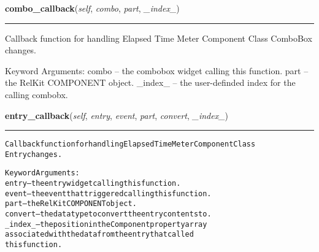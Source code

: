     \vspace{0.5ex}

\hspace{.8\funcindent}\begin{boxedminipage}{\funcwidth}

    \raggedright \textbf{combo\_callback}(\textit{self}, \textit{combo}, \textit{part}, \textit{\_index\_})

    \vspace{-1.5ex}

    \rule{\textwidth}{0.5\fboxrule}
\setlength{\parskip}{2ex}
    Callback function for handling Elapsed Time Meter Component Class 
    ComboBox changes.

    Keyword Arguments: combo   -- the combobox widget calling this 
    function. part    -- the RelKit COMPONENT object. \_index\_ -- the 
    user-definded index for the calling combobx.

\setlength{\parskip}{1ex}
    \end{boxedminipage}

    \label{reliafree:meters:meter:ElapsedTime:entry_callback}

    \vspace{0.5ex}

\hspace{.8\funcindent}\begin{boxedminipage}{\funcwidth}

    \raggedright \textbf{entry\_callback}(\textit{self}, \textit{entry}, \textit{event}, \textit{part}, \textit{convert}, \textit{\_index\_})

    \vspace{-1.5ex}

    \rule{\textwidth}{0.5\fboxrule}
\setlength{\parskip}{2ex}
\begin{alltt}
Callback function for handling Elapsed Time Meter Component Class
Entry changes.

Keyword Arguments:
entry   -- the entry widget calling this function.
event   -- the event that triggered calling this function.
part    -- the RelKit COMPONENT object.
convert -- the data type to convert the entry contents to.
\_index\_ -- the position in the Component property array
           associated with the data from the entry that called
           this function.
\end{alltt}

\setlength{\parskip}{1ex}
    \end{boxedminipage}

